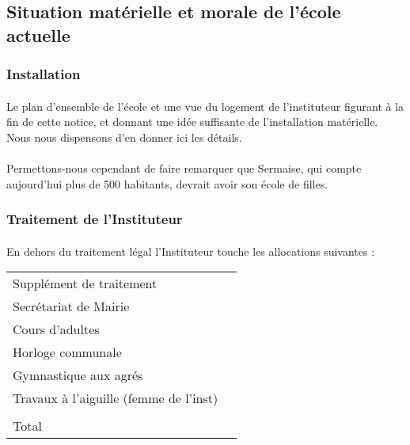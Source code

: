 \documentclass[../eBook.tex]{subfiles}
\begin{document}
  \subsection*{Situation matérielle et morale de l'école actuelle}
    \subsubsection*{Installation}
      \paragraph{}Le plan d'ensemble de l'école et une vue du logement de l'instituteur figurant à la fin de cette notice, et donnant une idée suffisante de l'installation matérielle. Nous nous dispensons d'en donner ici les détails.
      \paragraph{}Permettons-nous cependant de faire remarquer que Sermaise, qui compte aujourd'hui plus de 500 habitants, devrait avoir son école de filles.

    \subsubsection*{Traitement de l'Instituteur}
      \paragraph{}En dehors du traitement légal l'Instituteur touche les allocations suivantes :
      \begin{center}
        \footnotesize{\begin{tabularx}{\textwidth}{m{} >{\raggedleft\arraybackslash}X}
          Supplément de traitement & 500\up{\uppercase{F}}\\
          Secrétariat de Mairie & 300\up{\uppercase{F}}\\
          Cours d'adultes & 100\up{\uppercase{F}}\\
          Horloge communale & 45\up{\uppercase{F}}\\
          Gymnastique aux agrés & 30\up{\uppercase{F}}\\
          Travaux à l'aiguille (femme de l'inst\up{r}) & 150\up{\uppercase{F}}\\
          &\\
          \hfill Total & 1125\up{\uppercase{F}}
        \end{tabularx}}
      \end{center}
\end{document}
